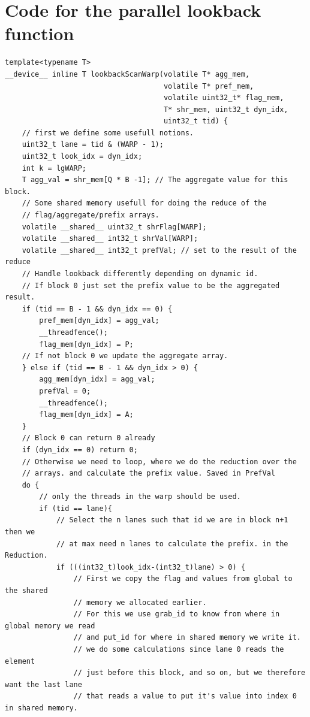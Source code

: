 \documentclass[twocolumn]{article}
\begin{document}
\newpage

\section{Code for the parallel lookback function}
\begin{lstlisting}[caption=parallel lookback function,label=lst:parLookbackScan]
template<typename T>
__device__ inline T lookbackScanWarp(volatile T* agg_mem,
								     volatile T* pref_mem,
								     volatile uint32_t* flag_mem,
								     T* shr_mem, uint32_t dyn_idx,
								     uint32_t tid) {
    // first we define some usefull notions.
    uint32_t lane = tid & (WARP - 1);
    uint32_t look_idx = dyn_idx;
    int k = lgWARP;
    T agg_val = shr_mem[Q * B -1]; // The aggregate value for this block.
    // Some shared memory usefull for doing the reduce of the
    // flag/aggregate/prefix arrays.
    volatile __shared__ uint32_t shrFlag[WARP];
    volatile __shared__ int32_t shrVal[WARP];
    volatile __shared__ int32_t prefVal; // set to the result of the reduce
	// Handle lookback differently depending on dynamic id.
    // If block 0 just set the prefix value to be the aggregated result.
    if (tid == B - 1 && dyn_idx == 0) {
		pref_mem[dyn_idx] = agg_val;
        __threadfence();
        flag_mem[dyn_idx] = P;
    // If not block 0 we update the aggregate array.
    } else if (tid == B - 1 && dyn_idx > 0) {
        agg_mem[dyn_idx] = agg_val;
        prefVal = 0;
        __threadfence();
        flag_mem[dyn_idx] = A;
    }
    // Block 0 can return 0 already
    if (dyn_idx == 0) return 0;
    // Otherwise we need to loop, where we do the reduction over the
    // arrays. and calculate the prefix value. Saved in PrefVal
    do {
        // only the threads in the warp should be used.
        if (tid == lane){
            // Select the n lanes such that id we are in block n+1 then we
            // at max need n lanes to calculate the prefix. in the Reduction.
            if (((int32_t)look_idx-(int32_t)lane) > 0) {
                // First we copy the flag and values from global to the shared
                // memory we allocated earlier.
                // For this we use grab_id to know from where in global memory we read
                // and put_id for where in shared memory we write it.
                // we do some calculations since lane 0 reads the element
                // just before this block, and so on, but we therefore want the last lane
                // that reads a value to put it's value into index 0 in shared memory.

\end{lstlisting}
\end{document}
